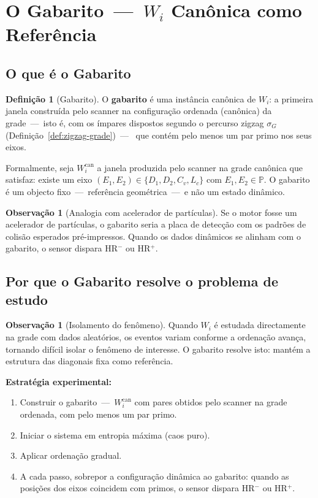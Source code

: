 \documentclass[12pt, a4paper]{article}
\theoremstyle{plain}
\theoremstyle{definition}
\newtheorem{definition}[theorem]{Definição}
\newtheorem{remark}[theorem]{Observação}
\theoremstyle{remark}
\begin{document}
	\section{O Gabarito~---~$W_i$ Canônica como Referência}
	\label{sec:gabarito}
	
	\subsection{O que é o Gabarito}
	
	\begin{definition}[Gabarito]
		\label{def:gabarito}
		O \textbf{gabarito} é uma instância canônica de $W_i$:
		a primeira janela construída pelo scanner na configuração ordenada
		(canônica) da grade~---~isto é, com os ímpares dispostos segundo
		o percurso zigzag $\sigma_G$ (Definição~\ref{def:zigzag-grade})~---~
		que contém pelo menos um par primo nos seus eixos.
		
		Formalmente, seja $W_i^{\text{can}}$ a janela produzida pelo
		scanner na grade canônica que satisfaz: existe um eixo
		$(E_1,E_2)\in\{D_1,D_2,C_v,L_c\}$ com $E_1,E_2\in\mathbb{P}$.
		O gabarito é um objecto fixo~---~referência geométrica~---~e não
		um estado dinâmico.
	\end{definition}
	
	\begin{remark}[Analogia com acelerador de partículas]
		Se o motor fosse um acelerador de partículas, o gabarito seria a
		placa de detecção com os padrões de colisão esperados
		pré-impressos.  Quando os dados dinâmicos se alinham com o
		gabarito, o sensor dispara HR$^-$ ou HR$^+$.
	\end{remark}
	
	\subsection{Por que o Gabarito resolve o problema de estudo}
	
	\begin{remark}[Isolamento do fenômeno]
		Quando $W_i$ é estudada directamente na grade com dados
		aleatórios, os eventos variam conforme a ordenação avança,
		tornando difícil isolar o fenômeno de interesse.  O gabarito
		resolve isto: mantém a estrutura das diagonais fixa como
		referência.
		
		\medskip\noindent\textbf{Estratégia experimental:}
		\begin{enumerate}
			\item Construir o gabarito~---~$W_i^{\text{can}}$ com
			pares obtidos pelo scanner na grade ordenada, com pelo menos
			um par primo.
			\item Iniciar o sistema em entropia máxima (caos puro).
			\item Aplicar ordenação gradual.
			\item A cada passo, sobrepor a configuração dinâmica ao
			gabarito: quando as posições dos eixos coincidem com primos,
			o sensor dispara HR$^-$ ou HR$^+$.
		\end{enumerate}
	\end{remark}
	
\end{document}
